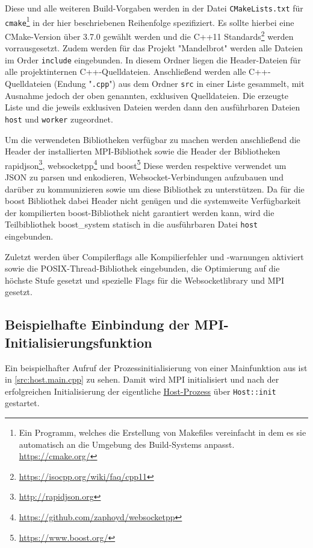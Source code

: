 Diese und alle weiteren Build-Vorgaben werden in der Datei \verb|CMakeLists.txt| für
\verb|cmake|\footnote{Ein Programm, welches die Erstellung von Makefiles vereinfacht in dem es sie automatisch an die Umgebung des Build-Systems anpasst. \url{https://cmake.org/}}
in der hier beschriebenen Reihenfolge spezifiziert.
Es sollte hierbei eine CMake-Version über 3.7.0 gewählt werden und die C++11 Standards\footnote{\url{https://isocpp.org/wiki/faq/cpp11}} werden vorrausgesetzt.
Zudem werden für das Projekt "Mandelbrot" werden alle Dateien im Order \verb|include| eingebunden.
In diesem Ordner liegen die Header-Dateien für alle projektinternen C++-Quelldateien.
Anschließend werden alle C++-Quelldateien (Endung "\verb|.cpp|") aus dem Ordner \verb|src| in einer Liste gesammelt, mit Ausnahme jedoch der oben genannten, exklusiven Quelldateien.
Die erzeugte Liste und die jeweils exklusiven Dateien werden dann den ausführbaren Dateien \verb|host| und \verb|worker| zugeordnet.

Um die verwendeten Bibliotheken verfügbar zu machen werden anschließend die Header der installierten MPI-Bibliothek
sowie die Header der Bibliotheken rapidjson\footnote{\url{http://rapidjson.org}}, websocketpp\footnote{\url{https://github.com/zaphoyd/websocketpp}} und boost\footnote{\url{https://www.boost.org/}}
Diese werden respektive verwendet um JSON zu parsen und enkodieren, Websocket-Verbindungen aufzubauen und darüber zu kommunizieren sowie um diese Bibliothek zu unterstützen.
Da für die boost Bibliothek dabei Header nicht genügen und die systemweite Verfügbarkeit der kompilierten boost-Bibliothek nicht garantiert werden kann, wird die Teilbibliothek boost\_system statisch
in die ausführbaren Datei \verb|host| eingebunden.

Zuletzt werden über Compilerflags alle Kompilierfehler und -warnungen aktiviert sowie die POSIX-Thread-Bibliothek eingebunden,
die Optimierung auf die höchste Stufe gesetzt und spezielle Flags für die Websocketlibrary und MPI gesetzt.

\subsection{Beispielhafte Einbindung der MPI-Initialisierungsfunktion}

Ein beispielhafter Aufruf der Prozessinitialisierung von einer Mainfunktion aus ist in \autoref{src:host.main.cpp} zu sehen. Damit wird MPI initialisiert und nach der
erfolgreichen Initialisierung der eigentliche \hyperref[cls:Host]{Host-Prozess} über \verb|Host::init| gestartet.

